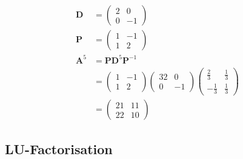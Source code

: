 \documentclass{article}
\begin{document}
\begin{align*}
  \mathbf{D}   & = \begin{pmatrix}
                     2 & 0  \\
                     0 & -1
                   \end{pmatrix}                                         \\
  \mathbf{P}   & = \begin{pmatrix}
                     1 & -1 \\
                     1 & 2
                   \end{pmatrix}                                         \\
  \mathbf{A}^5 & = \mathbf{P} \mathbf{D}^5 \mathbf{P}^{-1}                \\
               & = \begin{pmatrix}
                     1 & -1 \\
                     1 & 2
                   \end{pmatrix} \begin{pmatrix}
                                   32 & 0  \\
                                   0  & -1
                                 \end{pmatrix} \begin{pmatrix}
                                                 \frac{2}{3}  & \frac{1}{3} \\
                                                 -\frac{1}{3} & \frac{1}{3}
                                               \end{pmatrix} \\
               & = \begin{pmatrix}
                     21 & 11 \\
                     22 & 10
                   \end{pmatrix}
\end{align*}

\subsection{LU-Factorisation}

\subsubsection{}
\end{document}
